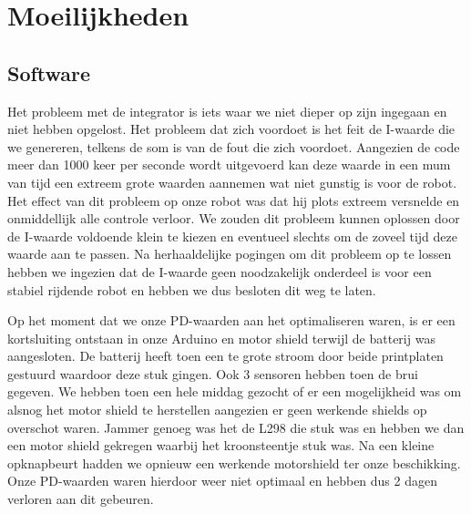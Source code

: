 \chapter{Moeilijkheden}
\section{Software}
Het probleem met de integrator is iets waar we niet dieper op zijn ingegaan en niet hebben opgelost. Het probleem dat zich voordoet is het feit de I-waarde die we genereren, telkens de som is van de fout die zich voordoet. Aangezien de code meer dan 1000 keer per seconde wordt uitgevoerd kan deze waarde in een mum van tijd een extreem grote waarden aannemen wat niet gunstig is voor de robot. Het effect van dit probleem op onze robot was dat hij plots extreem versnelde en onmiddellijk alle controle verloor. We zouden dit probleem kunnen oplossen door de I-waarde voldoende klein te kiezen en eventueel slechts om de zoveel tijd deze waarde aan te passen. Na herhaaldelijke pogingen om dit probleem op te lossen hebben we ingezien dat de I-waarde geen noodzakelijk onderdeel is voor een stabiel rijdende robot en hebben we dus besloten dit weg te laten.

Op het moment dat we onze PD-waarden aan het optimaliseren waren, is er een kortsluiting ontstaan in onze Arduino en motor shield terwijl de batterij was aangesloten. De batterij heeft toen een te grote stroom door beide printplaten gestuurd waardoor deze stuk gingen. Ook 3 sensoren hebben toen de brui gegeven. We hebben toen een hele middag gezocht of er een mogelijkheid was om alsnog het motor shield te herstellen aangezien er geen werkende shields op overschot waren. Jammer genoeg was het de L298 die stuk was en hebben we dan een motor shield gekregen waarbij het kroonsteentje stuk was. Na een kleine opknapbeurt hadden we opnieuw een werkende motorshield ter onze beschikking. Onze PD-waarden waren hierdoor weer niet optimaal en hebben dus 2 dagen verloren aan dit gebeuren.

